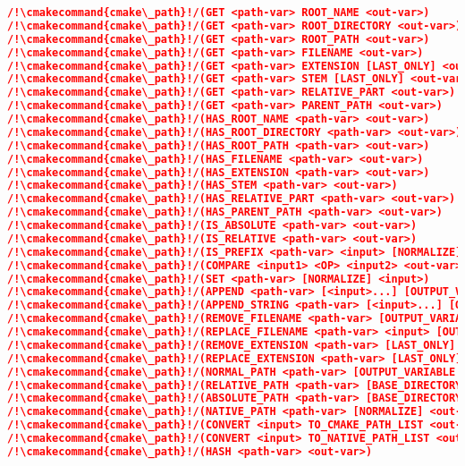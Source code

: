 \documentclass{article}
\newcommand{\cmakecommand}[1]{{\href{https://cmake.org/cmake/help/v3.20/command/#1.html}{#1}}}
\begin{document}
\hfill\vline\hfill
\begin{minipage}[t]{0.18\linewidth}
\begin{lstlisting}[language=CMake]
/!\cmakecommand{cmake\_path}!/(GET <path-var> ROOT_NAME <out-var>)
/!\cmakecommand{cmake\_path}!/(GET <path-var> ROOT_DIRECTORY <out-var>)
/!\cmakecommand{cmake\_path}!/(GET <path-var> ROOT_PATH <out-var>)
/!\cmakecommand{cmake\_path}!/(GET <path-var> FILENAME <out-var>)
/!\cmakecommand{cmake\_path}!/(GET <path-var> EXTENSION [LAST_ONLY] <out-var>)
/!\cmakecommand{cmake\_path}!/(GET <path-var> STEM [LAST_ONLY] <out-var>)
/!\cmakecommand{cmake\_path}!/(GET <path-var> RELATIVE_PART <out-var>)
/!\cmakecommand{cmake\_path}!/(GET <path-var> PARENT_PATH <out-var>)
/!\cmakecommand{cmake\_path}!/(HAS_ROOT_NAME <path-var> <out-var>)
/!\cmakecommand{cmake\_path}!/(HAS_ROOT_DIRECTORY <path-var> <out-var>)
/!\cmakecommand{cmake\_path}!/(HAS_ROOT_PATH <path-var> <out-var>)
/!\cmakecommand{cmake\_path}!/(HAS_FILENAME <path-var> <out-var>)
/!\cmakecommand{cmake\_path}!/(HAS_EXTENSION <path-var> <out-var>)
/!\cmakecommand{cmake\_path}!/(HAS_STEM <path-var> <out-var>)
/!\cmakecommand{cmake\_path}!/(HAS_RELATIVE_PART <path-var> <out-var>)
/!\cmakecommand{cmake\_path}!/(HAS_PARENT_PATH <path-var> <out-var>)
/!\cmakecommand{cmake\_path}!/(IS_ABSOLUTE <path-var> <out-var>)
/!\cmakecommand{cmake\_path}!/(IS_RELATIVE <path-var> <out-var>)
/!\cmakecommand{cmake\_path}!/(IS_PREFIX <path-var> <input> [NORMALIZE] <out-var>)
/!\cmakecommand{cmake\_path}!/(COMPARE <input1> <OP> <input2> <out-var>)
/!\cmakecommand{cmake\_path}!/(SET <path-var> [NORMALIZE] <input>)
/!\cmakecommand{cmake\_path}!/(APPEND <path-var> [<input>...] [OUTPUT_VARIABLE <out-var>])
/!\cmakecommand{cmake\_path}!/(APPEND_STRING <path-var> [<input>...] [OUTPUT_VARIABLE <out-var>])
/!\cmakecommand{cmake\_path}!/(REMOVE_FILENAME <path-var> [OUTPUT_VARIABLE <out-var>])
/!\cmakecommand{cmake\_path}!/(REPLACE_FILENAME <path-var> <input> [OUTPUT_VARIABLE <out-var>])
/!\cmakecommand{cmake\_path}!/(REMOVE_EXTENSION <path-var> [LAST_ONLY] [OUTPUT_VARIABLE <out-var>])
/!\cmakecommand{cmake\_path}!/(REPLACE_EXTENSION <path-var> [LAST_ONLY] <input> [OUTPUT_VARIABLE <out-var>])
/!\cmakecommand{cmake\_path}!/(NORMAL_PATH <path-var> [OUTPUT_VARIABLE <out-var>])
/!\cmakecommand{cmake\_path}!/(RELATIVE_PATH <path-var> [BASE_DIRECTORY <input>] [OUTPUT_VARIABLE <out-var>])
/!\cmakecommand{cmake\_path}!/(ABSOLUTE_PATH <path-var> [BASE_DIRECTORY <input>] [NORMALIZE] [OUTPUT_VARIABLE <out-var>])
/!\cmakecommand{cmake\_path}!/(NATIVE_PATH <path-var> [NORMALIZE] <out-var>)
/!\cmakecommand{cmake\_path}!/(CONVERT <input> TO_CMAKE_PATH_LIST <out-var>)
/!\cmakecommand{cmake\_path}!/(CONVERT <input> TO_NATIVE_PATH_LIST <out-var>)
/!\cmakecommand{cmake\_path}!/(HASH <path-var> <out-var>)


\end{lstlisting}
\end{minipage}
\end{document}
